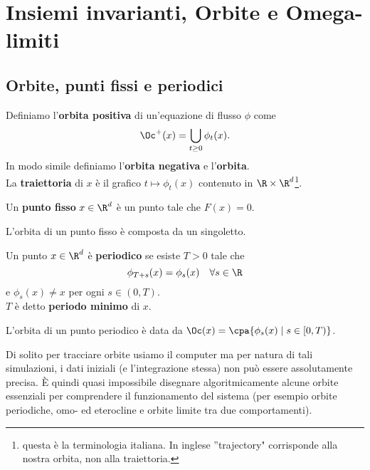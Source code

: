 \chapter{Insiemi invarianti, Orbite e Omega-limiti}

\section{Orbite, punti fissi e periodici}
\begin{definition}[Orbita]
Definiamo l'\textbf{orbita positiva} di un'equazione di flusso $\phi$ come
\[\Oc^+(x)=\bigcup_{t\geq 0}\phi_t(x).\]
In modo simile definiamo l'\textbf{orbita negativa} e l'\textbf{orbita}.\\
La \textbf{traiettoria} di $x$ \`e il grafico $t\mapsto \phi_t(x)$ contenuto in $\R\times \R^d$\footnote{questa \`e la terminologia italiana. In inglese ''trajectory" corrisponde alla nostra orbita, non alla traiettoria.}.
\end{definition}

\begin{definition}
Un \textbf{punto fisso} $x\in\R^d$ \`e un punto tale che $F(x)=0$.
\end{definition}
\begin{remark}
L'orbita di un punto fisso \`e composta da un singoletto.
\end{remark}

\begin{definition}
Un punto $x\in\R^d$ \`e \textbf{periodico} se esiste $T>0$ tale che
\[\phi_{T+s}(x)=\phi_s(x)\quad \forall s\in\R\]
e $\phi_s(x)\neq x$ per ogni $s\in (0,T)$.\\
$T$ \`e detto \textbf{periodo minimo} di $x$.
\end{definition}
\begin{remark}
L'orbita di un punto periodico \`e data da
$\Oc(x)=\cpa{\phi_s(x)\mid s\in[0,T)}$.
\end{remark}

\begin{remark}[Simulazione]
Di solito per tracciare orbite usiamo il computer ma per natura di tali simulazioni, i dati iniziali (e l'integrazione stessa) non pu\`o essere assolutamente precisa. \`E quindi quasi impossibile disegnare algoritmicamente alcune orbite essenziali per comprendere il funzionamento del sistema (per esempio orbite periodiche, omo- ed eterocline e orbite limite tra due comportamenti). 
\end{remark}

